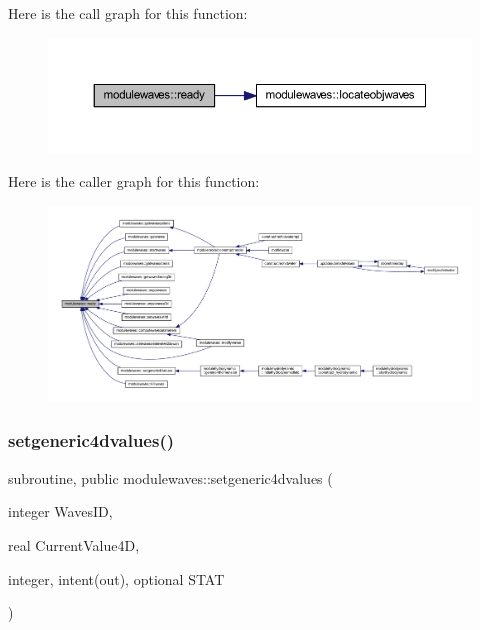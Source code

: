 Here is the call graph for this function\+:\nopagebreak
\begin{figure}[H]
\begin{center}
\leavevmode
\includegraphics[width=350pt]{namespacemodulewaves_a15beb6e5dff252a4c77c47d43f9b6385_cgraph}
\end{center}
\end{figure}
Here is the caller graph for this function\+:\nopagebreak
\begin{figure}[H]
\begin{center}
\leavevmode
\includegraphics[width=350pt]{namespacemodulewaves_a15beb6e5dff252a4c77c47d43f9b6385_icgraph}
\end{center}
\end{figure}
\mbox{\label{namespacemodulewaves_a27286ddaee0e46cf76c86b80a35ee9ad}} 
\subsubsection{\texorpdfstring{setgeneric4dvalues()}{setgeneric4dvalues()}}
{\footnotesize\ttfamily subroutine, public modulewaves\+::setgeneric4dvalues (\begin{DoxyParamCaption}\item[{integer}]{Waves\+ID,  }\item[{real}]{Current\+Value4D,  }\item[{integer, intent(out), optional}]{S\+T\+AT }\end{DoxyParamCaption})}

